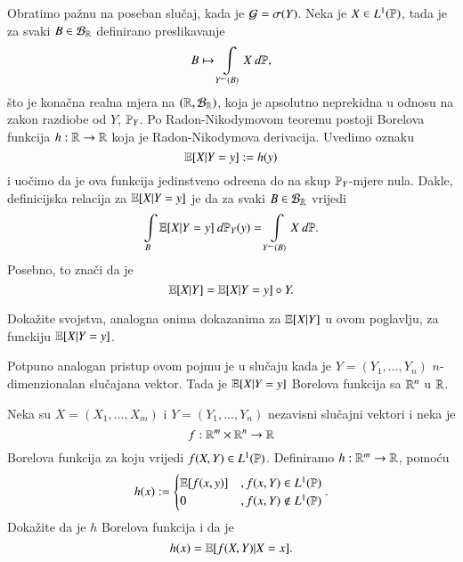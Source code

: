 Obratimo pa\v znu na poseban slu\v caj, kada je $\mathcal{G} = \sigma({Y})$.
Neka je $X \in L^1 (\mathbb{P})$, tada je za svaki $B \in \mathcal{B}_{\mathbb{R}}$ definirano preslikavanje
\begin{equation*}
    B \mapsto \int\limits_{{Y}^{\leftarrow} (B)} X \: d \mathbb{P},
\end{equation*}
\v sto je kona\v cna realna mjera na $(\mathbb{R}, \mathcal{B}_{\mathbb{R}})$, koja je apsolutno neprekidna u odnosu na zakon razdiobe od $Y$, $\mathbb{P}_Y$.
Po Radon-Nikodymovom teoremu postoji Borelova funkcija $h : \mathbb{R} \to \mathbb{R}$ koja je Radon-Nikodymova derivacija.
Uvedimo oznaku
\begin{equation}    \label{jed:22.19}
    \mathbb{E} [X | Y = y] := h (y)
\end{equation}
i uo\v cimo da je ova funkcija jedinstveno odre\dj ena do na skup $\mathbb{P}_Y$-mjere nula.
Dakle, definicijska relacija za $\mathbb{E} [X | Y = y]$ je da za svaki $B \in \mathcal{B}_{\mathbb{R}}$ vrijedi
\begin{equation}    \label{jed:22.20}
    \int\limits_B \mathbb{E} [X | Y = y] \: d \mathbb{P}_Y (y) = \int\limits_{{Y}^{\leftarrow} (B)} X \: d \mathbb{P}.
\end{equation}
Posebno, to zna\v ci da je
\begin{equation}    \label{jed:22.21}
    \mathbb{E} [X | Y] = \mathbb{E} [X | Y = y] \circ Y.
\end{equation}

\begin{zad} \label{zad:22.22}
    Doka\v zite svojstva, analogna onima dokazanima za $\mathbb{E} [X | Y]$ u ovom poglavlju, za funckiju $\mathbb{E} [X | Y = y]$.
\end{zad}

\begin{nap} \label{nap:22.23}
    Potpuno analogan pristup ovom pojmu je u slu\v caju kada je $Y = (Y_1, \ldots, Y_n)$ $n$-dimenzionalan slu\v cajana vektor.
    Tada je $\mathbb{E} [X | Y = y]$ Borelova funkcija sa $\mathbb{R}^n$ u $\mathbb{R}$.
\end{nap}

\begin{zad} \label{zad:22.24}
    Neka su $X = (X_1, \ldots, X_m)$ i $Y = (Y_1, \ldots, Y_n)$ nezavisni slu\v cajni vektori i neka je
    \begin{equation*}
        f : \mathbb{R}^m \times \mathbb{R}^n \to \mathbb{R}
    \end{equation*}
    Borelova funkcija za koju vrijedi $f (X, Y) \in L^1 (\mathbb{P})$.
    Definiramo $h: \mathbb{R}^m \to \mathbb{R}$, pomo\' cu
    \begin{equation*}
        h (x) :=
        \begin{cases}
            \mathbb{E} [ f (x, y)] &, f (x, Y) \in L^1 (\mathbb{P})\\
            0 &, f (x, Y) \notin L^1 (\mathbb{P})
        \end{cases}.
    \end{equation*}
    Doka\v zite da  je $h$ Borelova funkcija i da je
    \begin{equation*}
        h (x) = \mathbb{E} [f (X, Y) | X = x].
    \end{equation*}
\end{zad}